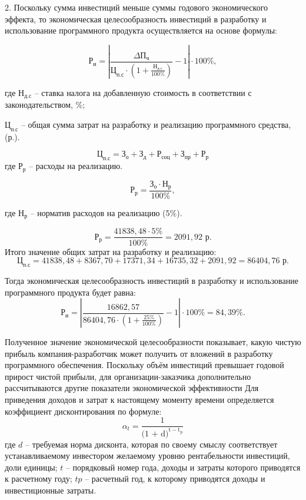 2. Поскольку сумма инвестиций меньше суммы годового экономического эффекта, то экономическая целесообразность инвестиций в разработку и использование программного продукта осуществляется на основе формулы:

\begin{equation}
\text{Р}_{\text{и}} = |\frac{\text{$\Delta$П}_{\text{ч}}}{\text{Ц}_{\text{п.с}} \cdot (1 + \frac{\text{Н}_{\text{д.с}}}{100\%})} - 1| \cdot 100\%,
\end{equation}

где $\text{Н}_{\text{д.с}}$ -- ставка налога на добавленную стоимость в соответствии с законодательством, {\%};

$\text{Ц}_{\text{п.с}}$ -- общая сумма затрат на разработку и реализацию программного средства, (р.).

\begin{equation}
\text{Ц}_{\text{п.с}} =\text{З}_{\text{о}} + \text{З}_{\text{д}} + \text{Р}_{\text{соц}} + \text{З}_{\text{пр}} + \text{Р}_{\text{р}}
\end{equation}
где $\text{Р}_{\text{р}}$ -- расходы на реализацию.

\begin{equation}
\text{Р}_{\text{р}} = \frac{\text{З}_{\text{о}} \cdot \text{Н}_{\text{р}}}{100\%},
\end{equation}

где $\text{Н}_{\text{р}}$ -- норматив расходов на реализацию (5\%).

\begin{equation}
\text{Р}_{\text{р}} = \frac{41838,48 \cdot 5\%}{100\%} = 2091,92 \text{ р}.
\end{equation}
Итого значение общих затрат на разработку и реализацию:
$$
\text{Ц}_{\text{п.с}} = 41838,48+8367,70+17371,34+16735,32+2091,92 = 86404,76 \text{ р}.
$$


Тогда экономическая целесообразность инвестиций в разработку и использование программного продукта будет равна:
\begin{equation}
\text{Р}_{\text{и}} = |\frac{16862,57 }{86404,76 \cdot (1 + \frac{25\%}{100\%})} - 1| \cdot 100\% = 84, 39 \%.
\end{equation}

Полученное значение экономической целесообразности показывает, какую чистую прибыль компания-разработчик может получить от вложений в разработку программного
обеспечения. Поскольку объём инвестиций превышает годовой прирост чистой прибыли, для организации-заказчика дополнительно рассчитываются
другие показатели экономической эффективности
Для приведения доходов и затрат к настоящему моменту времени
определяется коэффициент дисконтирования по формуле:
\begin{equation}
\alpha_t = \frac{1}{\text{(1 + d)}^{\text{t}-\text{t}_\text{p}}}
\end{equation}
где $d$ – требуемая норма дисконта, которая по своему смыслу соответствует устанавливаемому инвестором желаемому уровню рентабельности инвестиций, доли единицы;
$t$  – порядковый номер года, доходы и затраты которого приводятся к расчетному году;
$tp$  – расчетный год, к которому приводятся доходы и инвестиционные затраты.

